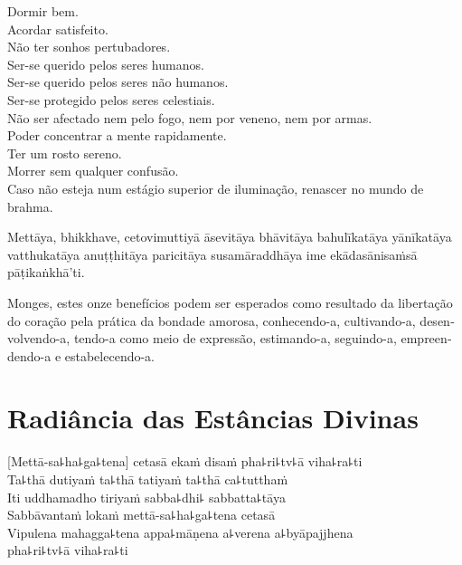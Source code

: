 \clearpage

\begin{english}
  Dormir bem.\\
  Acordar satisfeito.\\
  Não ter sonhos pertubadores.\\
  Ser-se querido pelos seres humanos.\\
  Ser-se querido pelos seres não humanos.\\
  Ser-se protegido pelos seres celestiais.\\
  Não ser afectado nem pelo fogo, nem por veneno, nem por armas.\\
  Poder concentrar a mente rapidamente.\\
  Ter um rosto sereno.\\
  Morrer sem qualquer confusão.\\
  Caso não esteja num estágio superior de iluminação, renascer no mundo de brahma.
\end{english}

Mettāya, bhikkhave, cetovimuttiyā āsevitāya bhāvitāya bahulīkatāya yānīkatāya vatthukatāya anuṭṭhitāya paricitāya susamāraddhāya ime ekādasānisaṁsā pāṭikaṅkhā'ti.

\begin{english}
  Monges, estes onze benefícios podem ser esperados como resultado da libertação do coração pela prática da bondade amorosa, conhecendo-a, cultivando-a, desenvolvendo-a, tendo-a como meio de expressão, estimando-a, seguindo-a, empreendendo-a e estabelecendo-a.
\end{english}

\chapter*[Radiância das Estâncias Divinas]{Radiância das Estâncias Divinas}

\delegateSetUseNext


\begin{leader}
\end{leader}

[Mettā-sa꜕ha꜕ga꜕tena] cetasā ekaṁ disaṁ pha꜕ri꜕tv꜕ā viha꜕ra꜕ti\\
Ta꜕thā dutiyaṁ ta꜕thā tatiyaṁ ta꜕thā ca꜕tutthaṁ\\
Iti uddhamadho tiriyaṁ sabba꜕dhi꜕ sabbatta꜕tāya\\
Sabbāvantaṁ lokaṁ mettā-sa꜕ha꜕ga꜕tena cetasā\\
Vipulena mahagga꜕tena appa꜕māṇena a꜕verena a꜕byāpajjhena\\
\vin pha꜕ri꜕tv꜕ā viha꜕ra꜕ti

